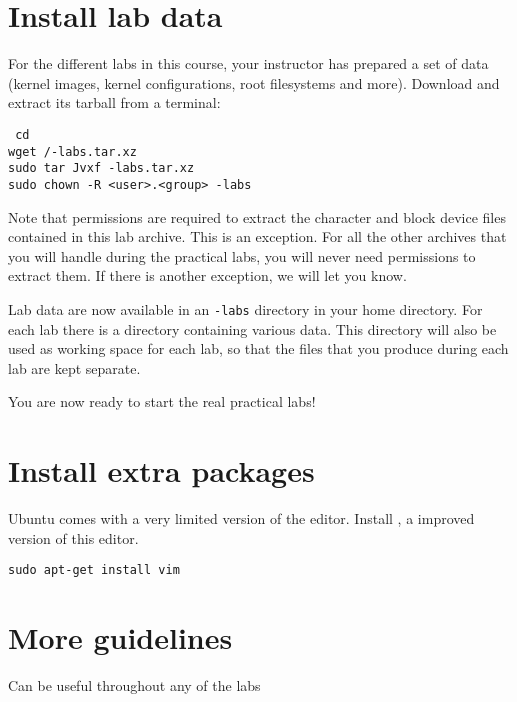 
\section{Install lab data}

For the different labs in this course, your instructor has prepared a
set of data (kernel images, kernel configurations, root filesystems
and more). Download and extract its tarball from a terminal:


{\scriptsize
{\tt
cd \\
wget \sessionurl/\longname-labs.tar.xz \\
sudo tar Jvxf \longname-labs.tar.xz \\
sudo chown -R <user>.<group> \longname-labs \\
}
}

Note that  permissions are required to extract the
character and block device files contained in this lab archive. This is
an exception. For all the other archives that you will handle during
the practical labs, you will never need  permissions to
extract them. If there is another exception, we will let you know.

Lab data are now available in an {\tt \longname-labs} directory in
your home directory. For each lab there is a directory containing
various data. This directory will also be used as working space for
each lab, so that the files that you produce during each lab are kept
separate.

You are now ready to start the real practical labs!

\section{Install extra packages}

Ubuntu comes with a very limited version of the 
editor. Install , a improved version of this editor.

\begin{verbatim}
sudo apt-get install vim
\end{verbatim}

\section{More guidelines}

Can be useful throughout any of the labs

